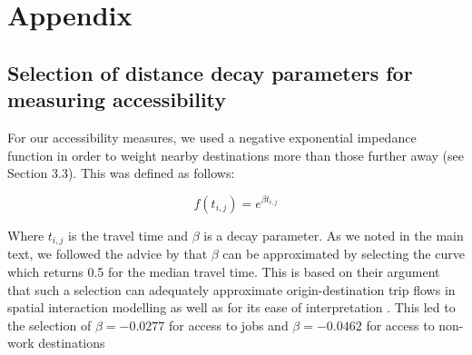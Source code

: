 \section*{Appendix}

\subsection*{Selection of distance decay parameters for measuring accessibility}

For our accessibility measures, we used a negative exponential impedance function in order to weight nearby destinations more than those further away (see Section 3.3). This was defined as follows:

\[f(t_{i,j}) = e^{\beta t_{i,j}}\]

Where $t_{i,j}$ is the travel time and $\beta$ is a decay parameter. As we noted in the main text, we followed the advice by  that $\beta$ can be approximated by selecting the curve which returns 0.5 for the median travel time. This is based on their argument that such a selection can adequately approximate origin-destination trip flows in spatial interaction modelling as well as for its ease of interpretation \cite{osth_new_2016}. This led to the selection of $\beta = -0.0277$ for access to jobs and $\beta = -0.0462$ for access to non-work destinations

